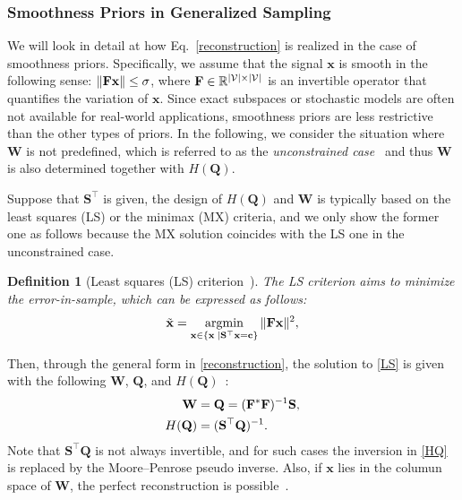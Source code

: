\documentclass[10pt,journal]{IEEEtran}
\theoremstyle{plain}
\newtheorem{dfn}{Definition}
\newcommand{\argmin}{\mathop{\rm argmin}\limits}
\newcommand{\varx}{\mathbf{x}}
\begin{document}
\subsubsection{Smoothness Priors in Generalized Sampling}
We will look in detail at how Eq.~\eqref{reconstruction} is realized in the case of smoothness priors. Specifically, we assume that the signal $\varx$ is smooth in the following sense:
$\|\hpf\varx\|\leq\sigma$,
where $\mathbf{F}\in\mathbb{R}^{|\mathcal{V}|\times|\mathcal{V}|}$ is an invertible operator that quantifies the variation of $\varx$. Since exact subspaces or stochastic models are often not available for real-world applications, smoothness priors are less restrictive than the other types of priors.
In the following, we consider the situation where $\mathbf{W}$ is not predefined, which is referred to as the \textit{unconstrained case}~\cite{Eldar2015sampling} and thus $\mathbf{W}$ is also determined together with $H(\mathbf{Q})$.

Suppose that $\mathbf{S}^{\top}$ is given, the design of $H(\mathbf{Q})$ and $\mathbf{W}$ is typically based on the least squares (LS) or the minimax (MX) criteria, and we only show the former one as follows because the MX solution coincides with the LS one in the unconstrained case.
\begin{dfn}[Least squares (LS) criterion~\cite{Eldar2015sampling}]
The LS criterion aims to minimize the error-in-sample, which can be expressed as follows:
\begin{equation}\label{LS}
\tilde{\varx} = \argmin_{\varx \in \{\varx\;|\SampM^\top\varx = \mathbf{c}\}} \|\hpf\varx\|^2,
\end{equation}
\end{dfn}
Then, through the general form in \eqref{reconstruction}, the solution to \eqref{LS} is given with the following $\mathbf{W}$, $\mathbf{Q}$, and $H(\mathbf{Q})$~\cite{Eldar2015sampling,Hara2022GSSS}:
\begin{align}
\mathbf{W} &= \mathbf{Q} = (\mathbf{F}^*\mathbf{F})^{-1}\mathbf{S},\label{Q}\\
H(\mathbf{Q}) &= (\mathbf{S^{\top}Q})^{-1}.\label{HQ}
\end{align}
Note that $\mathbf{S^{\top}Q}$ is not always invertible, and for such cases the inversion in \eqref{HQ} is replaced by the Moore–Penrose pseudo inverse. Also, if $\varx$ lies in the columun space of $\mathbf{W}$, the perfect reconstruction is possible~\cite{Eldar2015sampling}.
\end{document}
